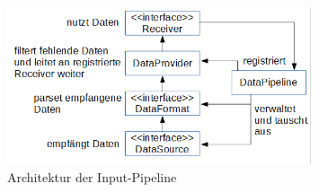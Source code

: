 \begin{figure}[H]
	\centering
	\includegraphics[width=0.8\textwidth]{3_Beschreibung_der_Bodenstation/Input-Pipeline_Architektur.png}
	\caption{Architektur der Input-Pipeline}
	\label{inputpipeline}
\end{figure}